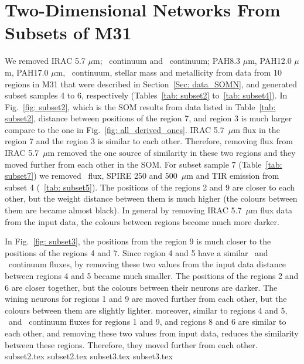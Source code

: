 \chapter{Two-Dimensional Networks From Subsets of M31}
\pagestyle{plain}
\label{sec: app_2d_soms_SOMN}
\myappendices

        We removed IRAC 5.7 $\mu$m; \sii~continuum and \oiii~continuum; PAH8.3 $\mu$m, PAH12.0 $\mu$m, PAH17.0 $\mu$m, \oiii~continuum, stellar mass and metallicity from data from 10 regions in M31 that were described in Section~\ref{Sec: data_SOMN}, and generated subset samples 4 to 6, respectively (Tables~\ref{tab: subset2} to~\ref{tab: subset4}).
        In Fig.~\ref{fig: subset2}, which is the SOM results from data listed in Table~\ref{tab: subset2}, distance between positions of the region 7, and region 3 is much larger compare to the one in Fig.~\ref{fig: all_derived_ones}. 
        IRAC 5.7~$\mu$m flux in the region 7 and the region 3 is similar to each other. 
        Therefore, removing flux from IRAC 5.7~$\mu$m removed the one source of similarity in these two regions and they moved further from each other in the SOM.
        For subset sample 7 (Table~\ref{tab: subset7}) we removed \sii~flux, SPIRE 250 and 500~$\mu$m and TIR emission from subset 4 (~\ref{tab: subset5}).
        The positions of the regions 2 and 9 are closer to each other, but the weight distance between them is much higher (the colours between them are became almost black). 
        In general by removing IRAC 5.7~$\mu$m flux data from the input data, the colours between regions become much more darker.
      
        In Fig.~\ref{fig: subset3}, the positions from the region 9 is much closer to the positions of the regions 4 and 7. 
        Since region 4 and 5 have a similar \oiii~and \sii~continuum fluxes, by removing these two values from the input data distance between regions 4 and 5 became much smaller.
        The positions of the regions 2 and 6 are closer together, but the colours between their neurons are darker.
        The wining neurons for regions 1 and 9 are moved further from each other, but the colours between them are slightly lighter. 
        moreover, similar to regions 4 and 5, \oiii~and \sii~continuum fluxes for regions 1 and 9, and regions 8 and 6 are similar to each other, and removing these two values from input data, reduces the similarity between these regions. Therefore, they moved further from each other. 
         {subset2.tex}
        {subset2.tex}
        {subset3.tex}
        {subset3.tex}
        

